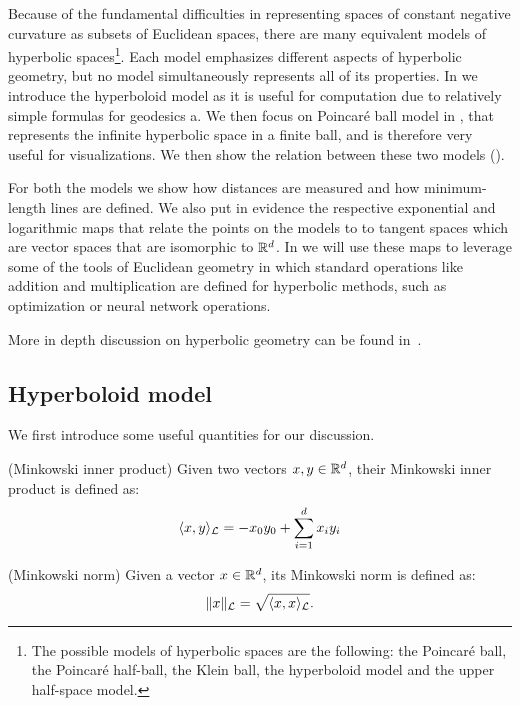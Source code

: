 Because of the fundamental difficulties in representing spaces of constant negative curvature as subsets of Euclidean spaces, there are many equivalent models of hyperbolic spaces\footnote{The possible models of hyperbolic spaces are the following: the Poincaré ball, the Poincaré half-ball, the Klein ball, the hyperboloid model and the upper half-space model.}. Each model emphasizes different aspects of hyperbolic geometry, but no model simultaneously represents all of its properties. In  we introduce the hyperboloid model as it is useful for computation due to relatively simple formulas for geodesics a. We then focus on Poincaré ball model in , that represents the infinite hyperbolic space in a finite ball, and is therefore very useful for visualizations. We then show the relation between these two models ().

For both the models we show how distances are measured and how minimum-length lines are defined. We also put in evidence the respective exponential and logarithmic maps that relate the points on the models to to tangent spaces which are vector spaces that are isomorphic to $\mathbb{R}^d$. In  we will use these maps to leverage some of the tools of Euclidean geometry in which standard operations like addition and multiplication are defined for hyperbolic methods, such as optimization or neural network operations.

More in depth discussion on hyperbolic geometry can be found in~\cite{Anderson2006hyperbolicGeometry}\cite{Ramsay2013introductionHyperbolicGeometry}.



\subsection{Hyperboloid model}\label{sec:hyperboloidModel}
We first introduce some useful quantities for our discussion.

\begin{definition}(Minkowski inner product) \label{def:minkowskiInnerProduct}
    Given two vectors $x,y \in \mathbb{R}^d$, their Minkowski inner product is defined as:
    \begin{equation*}
        \langle x, y \rangle_{\mathcal{L}} = -x_0y_0+\sum_{i=1}^d x_iy_i
    \end{equation*}    
\end{definition}

\begin{definition}(Minkowski norm) \label{def:minkowskiNorm}
    Given a vector $x \in \mathbb{R}^d$, its Minkowski norm is defined as:
    \begin{equation*}
        \|x\|_{\mathcal{L}} = \sqrt{\langle x, x \rangle_{\mathcal{L}}}.
    \end{equation*}
\end{definition}

